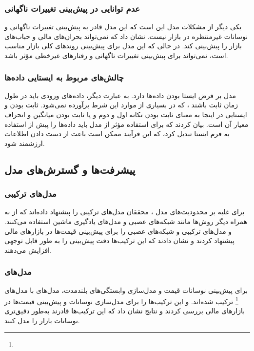 \subsubsection{عدم توانایی در پیش‌بینی تغییرات ناگهانی}
یکی دیگر از مشکلات مدل  این است که این مدل قادر به پیش‌بینی تغییرات ناگهانی و نوسانات غیرمنتظره در بازار نیست. \cite{diebold2001forecasting} نشان داد که  نمی‌تواند بحران‌های مالی و حباب‌های بازار را پیش‌بینی کند. در حالی که این مدل برای پیش‌بینی روندهای کلی بازار مناسب است، نمی‌تواند برای پیش‌بینی تغییرات ناگهانی و رفتارهای غیرخطی مؤثر باشد.

\subsubsection{چالش‌های مربوط به ایستایی داده‌ها}
مدل   بر فرض ایستا بودن داده‌ها دارد. به عبارت دیگر، داده‌های ورودی باید در طول زمان ثابت باشند ، که در بسیاری از موارد این شرط برآورده نمی‌شود. ثابت بودن و ایستایی در اینجا به معنای ثابت بودن تکانه اول و دوم و یا ثابت بودن میانگین و انحراف معیار آن است. \cite{hamilton1994time} بیان کردند که برای استفاده مؤثر از مدل  باید داده‌ها را پیش از استفاده به فرم ایستا تبدیل کرد، که این فرآیند ممکن است باعث از دست دادن اطلاعات ارزشمند شود.

\subsection{پیشرفت‌ها و گسترش‌های مدل }

\subsubsection{مدل‌های ترکیبی }
برای غلبه بر محدودیت‌های مدل ، محققان مدل‌های ترکیبی را پیشنهاد داده‌اند که از  به همراه دیگر روش‌ها مانند شبکه‌های عصبی و مدل‌های یادگیری ماشین استفاده می‌کنند. \cite{armstrong2001forecasting} و \cite{zhang2005forecasting} مدل‌های ترکیبی  و شبکه‌های عصبی را برای پیش‌بینی قیمت‌ها در بازارهای مالی پیشنهاد کردند و نشان دادند که این ترکیب‌ها دقت پیش‌بینی را به طور قابل توجهی افزایش می‌دهند.

\subsubsection{مدل‌های }

برای پیش‌بینی نوسانات قیمت و مدل‌سازی وابستگی‌های بلندمدت، مدل‌های  با مدل‌های \footnote{} ترکیب شده‌اند. \cite{engle1982autogressive} و \cite{bollerslev1986generalized} این ترکیب‌ها را برای مدل‌سازی نوسانات و پیش‌بینی قیمت‌ها در بازارهای مالی بررسی کردند و نتایج نشان داد که این ترکیب‌ها قادرند به‌طور دقیق‌تری نوسانات بازار را مدل کنند.



